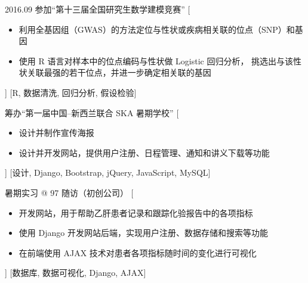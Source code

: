 \documentclass[zh]{resume}
\begin{document}
\begin{experiences}

  \separator{0.5em}
  \experience
    {2016.09}%
    {参加\enquote{第十三届全国研究生数学建模竞赛}}%
    [\begin{itemize}
      \item 利用全基因组（GWAS）的方法定位与性状或疾病相关联的位点（SNP）和基因
      \item 使用 R 语言对样本中的位点编码与性状做 Logistic 回归分析，
            挑选出与该性状关联最强的若干位点，并进一步确定相关联的基因
    \end{itemize}]%
    [R, 数据清洗, 回归分析, 假设检验]

  \separator{0.5em}
    {筹办\enquote{第一届中国--新西兰联合 SKA 暑期学校}}%
    [\begin{itemize}
      \item 设计并制作宣传海报
      \item 设计并开发网站，提供用户注册、日程管理、通知和讲义下载等功能
    \end{itemize}]%
    [设计, Django, Bootstrap, jQuery, JavaScript, MySQL]

  \separator{0.5em}
    {暑期实习 @ 97 随访（初创公司）}%
    [\begin{itemize}
      \item 开发网站，用于帮助乙肝患者记录和跟踪化验报告中的各项指标
      \item 使用 Django 开发网站后端，实现用户注册、数据存储和搜索等功能
      \item 在前端使用 AJAX 技术对患者各项指标随时间的变化进行可视化
    \end{itemize}]%
    [数据库, 数据可视化, Django, AJAX]

\end{experiences}

%
\end{document}
